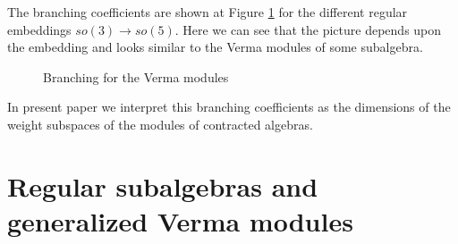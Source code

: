 \documentclass[12pt]{article}
\theoremstyle{definition}
\begin{document}
The branching coefficients are shown at Figure \ref{fig:B2_Verma_Branch2} for the different regular embeddings $so(3)\to so(5)$. Here we can see that the picture depends upon the embedding and looks similar to the Verma modules of some subalgebra.
\begin{figure}[h!bt]
  \noindent{}
  \caption{Branching for the Verma modules}
  
  \label{fig:B2_Verma_Branch2}
\end{figure}
In present paper we interpret this branching coefficients as the dimensions of the weight subspaces of the modules of contracted algebras.



\section{Regular subalgebras and generalized Verma modules}
\label{sec:regul-subalg-gener}
\end{document}
